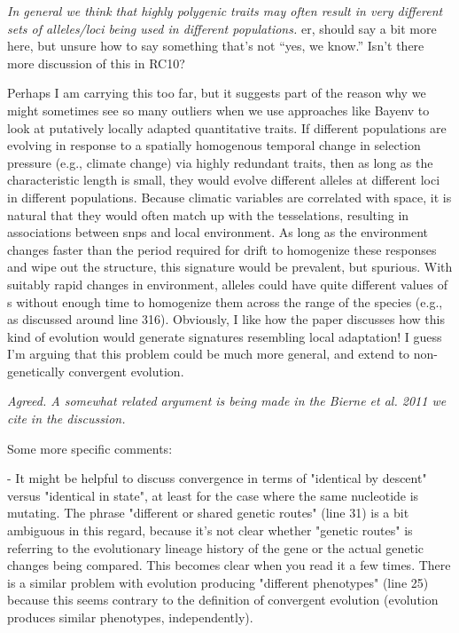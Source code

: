 \documentclass[12pt,letterpaper]{article}
\newcommand{\plr}[1]{{ \color{green} #1}}
\newcommand{\response}[1]{\emph{ \color{blue} #1}}
\begin{document}
\response{In general we think that highly polygenic traits may often result in very different sets of alleles/loci being used  in different populations. }
\plr{er, should say a bit more here, but unsure how to say something that's not ``yes, we know.'' Isn't there more discussion of this in RC10?}

Perhaps I am carrying this too far, but it suggests part of the reason why we might sometimes see so many outliers when we use approaches like Bayenv to look at putatively locally adapted quantitative traits. If different populations are evolving in response to a spatially homogenous temporal change in selection pressure (e.g., climate change) via highly redundant traits, then as long as the characteristic length is small, they would evolve different alleles at different loci in different populations. Because climatic variables are correlated with space, it is natural that they would often match up with the tesselations, resulting in associations between snps and local environment. As long as the environment changes faster than the period required for drift to homogenize these responses and wipe out the structure, this signature would be prevalent, but spurious. With suitably rapid changes in environment, alleles could have quite different values of s without enough time to homogenize them across the range of the species (e.g., as discussed around line 316). Obviously, I like how the paper discusses how this kind of evolution would generate signatures resembling local adaptation! I guess I'm arguing that this problem could be much more general, and extend to non-genetically convergent evolution.

\response{Agreed. A somewhat related argument is being made in the Bierne et al. 2011 we cite in the discussion.}

Some more specific comments:

- It might be helpful to discuss convergence in terms of "identical by descent" versus "identical in state", at least for the case where the same nucleotide is mutating. The phrase "different or shared genetic routes" (line 31) is a bit ambiguous in this regard, because it's not clear whether "genetic routes" is referring to the evolutionary lineage history of the gene or the actual genetic changes being compared. This becomes clear when you read it a few times. There is a similar problem with evolution producing "different phenotypes" (line 25) because this seems contrary to the definition of convergent evolution (evolution produces similar phenotypes, independently).
\end{document}
